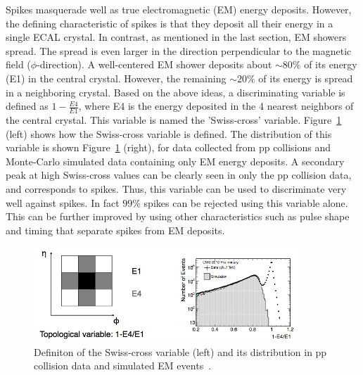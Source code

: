Spikes masquerade well as true electromagnetic (EM) energy deposits. However, the defining characteristic of spikes is that they deposit all their energy in a single ECAL crystal. In contrast, as mentioned in the last section, EM showers spread. The spread is even larger in the direction perpendicular to the magnetic field ($\phi$-direction). A well-centered EM shower deposits about $\sim80\%$ of its energy (E1) in the central crystal. However, the remaining $\sim20\%$ of its energy is spread in a neighboring crystal. Based on the above ideas, a discriminating variable is defined as $1-\frac{E4}{E1}$, where E4 is the energy deposited in the 4 nearest neighbors of the central crystal. This variable is named the 'Swiss-cross' variable. Figure~\ref{fig:swisscross} (left) shows how the Swiss-cross variable is defined. The distribution of this variable is shown Figure~\ref{fig:swisscross} (right), for data collected from pp collisions and Monte-Carlo simulated data containing only EM energy deposits. A secondary peak at high Swiss-cross values can be clearly seen in only the pp collision data, and corresponds to spikes. Thus, this variable can be used to discriminate very well against spikes. In fact $99\%$ spikes can be rejected using this variable alone. This can be further improved by using other characteristics such as pulse shape and timing that separate spikes from EM deposits.


\begin{figure}
\begin{center}
  \includegraphics[width=0.9\textwidth,keepaspectratio]{plots_and_figures/chapter3/swisscross.png}
\caption{Definiton of the Swiss-cross variable (left) and its distribution in pp collision data and simulated EM events~\cite{petyt}.}
\label{fig:swisscross}
\end{center}
\end{figure}


